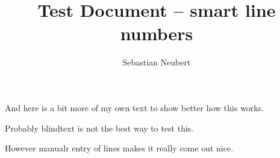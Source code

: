 \documentclass[12pt]{article}
\begin{document}

\title{Test Document -- smart line numbers}
\author{Sebastian Neubert}
\date{}
\maketitle
\thispagestyle{empty}
\pagestyle{empty}

\blindtext

And here is a bit more of my own text to show better how this works.

Probably blindtext is not the best way to test this.

However manualr entry of lines makes it really come out nice.
\end{document}
